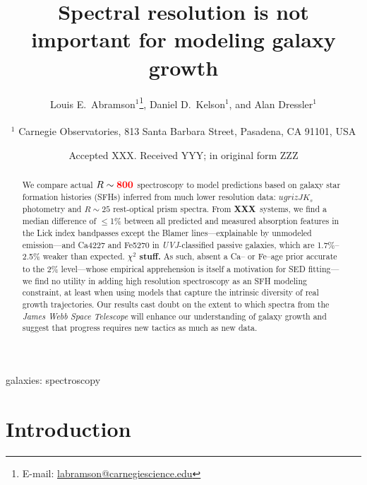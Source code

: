 \documentclass[a4paper,fleqn,usenatbib]{mnras}
\title[Who needs spectra?]{Spectral resolution is not important for modeling galaxy growth}
\author[Abramson, Kelson, \& Dressler]{Louis E.~Abramson$^{1}$\thanks{E-mail: \href{mailto:labramson@carnegiescience.edu}{labramson@carnegiescience.edu}},
Daniel D.~Kelson$^{1}$,
and Alan Dressler$^{1}$
\\
\\
$^1$	Carnegie Observatories, 813 Santa Barbara Street, Pasadena, CA 91101, USA\\
}
\date{Accepted XXX. Received YYY; in original form ZZZ}
\newcommand{\Mstel}{M_\ast}
\newcommand{\bfr}{\bf\color{red}}
\newcommand{\ntot}{{\bfr XXX}} %
\begin{document}
\label{firstpage}
\pagerange{\pageref{firstpage}--\pageref{lastpage}}
\maketitle

\begin{abstract}

	We compare actual $R\sim{\bfr 800}$ spectroscopy to model predictions based on galaxy 
	star formation histories (SFHs) inferred from much lower resolution data: $ugrizJK_{s}$ 
	photometry and $R\sim25$ rest-optical prism spectra. From \ntot\ systems, we find a median 
	difference of $\leq$1\% between all predicted and measured absorption features in the Lick index 
	bandpasses except the Blamer lines---explainable by unmodeled emission---and Ca4227 and 
	Fe5270 in {\it UVJ}-classified passive galaxies, which are 1.7\%--2.5\% weaker than expected. 
	{\bfr $\chi^{2}$ stuff.} As such, absent a Ca-- or Fe--age prior accurate to the 2\% level---whose 
	empirical apprehension is itself a motivation for SED fitting---we find no utility in adding 
	high resolution spectroscopy as an SFH modeling constraint, at least when using models that capture 
	the intrinsic diversity of real growth trajectories. Our results cast doubt on the extent to which 
	spectra from the {\it James Webb Space Telescope} will enhance our understanding of galaxy 
	growth and suggest that progress requires new tactics as much as new data.

\end{abstract}

\begin{keywords}
	galaxies: spectroscopy
\end{keywords}



\section{Introduction}
\label{sec:intro}
\end{document}
